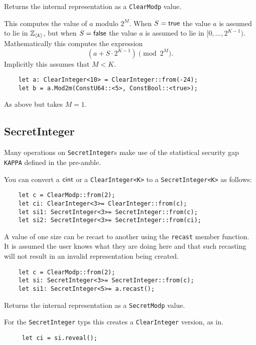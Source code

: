 Returns the internal representation as a \verb|ClearModp| value.

This computes the value of $a$ modulo $2^M$.
When $S={\mathsf{true}}$ the value $a$ is assumed to lie in ${\mathbb{Z}}_{\langle k \rangle}$,
but when $S={\mathsf{false}}$ the value $a$ is assumed to lie in $[0,\ldots,2^{K-1})$.
Mathematically this computes the expression
\[  \left( a + S \cdot 2^{K-1} \right) \pmod 2^M. \]
Implicitly this assumes that $M < K$.
\begin{lstlisting}
    let a: ClearInteger<10> = ClearInteger::from(-24);
    let b = a.Mod2m(ConstU64::<5>, ConstBool::<true>);
\end{lstlisting}

As above but takes $M=1$.



\subsection{SecretInteger}
Many operations on \verb|SecretInteger|s make use of the statistical
security gap \verb|KAPPA| defined in the pre-amble.

You can convert a $\mathsf{cint}$ or a \verb|ClearInteger<K>| to a
\verb|SecretInteger<K>|
as follows:
\begin{lstlisting}
    let c = ClearModp::from(2);
    let ci: ClearInteger<3>= ClearInteger::from(c);
    let si1: SecretInteger<3>= SecretInteger::from(c);
    let si2: SecretInteger<3>= SecretInteger::from(ci);
\end{lstlisting}

A value of one size can be recast to another using the \verb|recast|
member function. It is assumed the user knows what they are doing here
and that such recasting will not result in an invalid representation
being created.
\begin{lstlisting}
    let c = ClearModp::from(2);
    let si: SecretInteger<3>= SecretInteger::from(c);
    let si1: SecretInteger<5>= a.recast();
\end{lstlisting}

Returns the internal representation as a \verb|SecretModp| value.

For the \verb|SecretInteger| typs this creates a \verb|ClearInteger| version, as in.
\begin{lstlisting}
     let ci = si.reveal();
\end{lstlisting}

